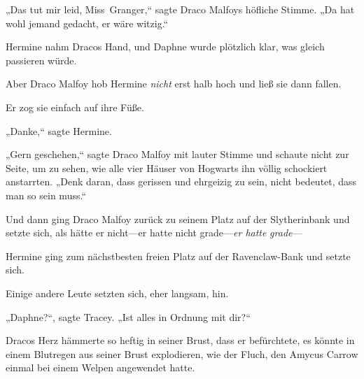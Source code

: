 „Das tut mir leid, Miss~Granger,“ sagte Draco Malfoys höfliche Stimme. „Da hat wohl jemand gedacht, er wäre witzig.“

Hermine nahm Dracos Hand, und Daphne wurde plötzlich klar, was gleich passieren würde.

Aber Draco Malfoy hob Hermine \emph{nicht} erst halb hoch und ließ sie dann fallen.

Er zog sie einfach auf ihre Füße.

„Danke,“ sagte Hermine.

„Gern geschehen,“ sagte Draco Malfoy mit lauter Stimme und schaute nicht zur Seite, um zu sehen, wie alle vier Häuser von Hogwarts ihn völlig schockiert anstarrten. „Denk daran, dass gerissen und ehrgeizig zu sein, nicht bedeutet, dass man so sein muss.“

Und dann ging Draco Malfoy zurück zu seinem Platz auf der Slytherinbank und setzte sich, als hätte er nicht—er hatte nicht grade—\emph{er hatte} \emph{grade}—

Hermine ging zum nächstbesten freien Platz auf der Ravenclaw-Bank und setzte sich.

Einige andere Leute setzten sich, eher langsam, hin.

„Daphne?“, sagte Tracey. „Ist alles in Ordnung mit dir?“

\later

Dracos Herz hämmerte so heftig in seiner Brust, dass er befürchtete, es könnte in einem Blutregen aus seiner Brust explodieren, wie der Fluch, den Amycus Carrow einmal bei einem Welpen angewendet hatte.

